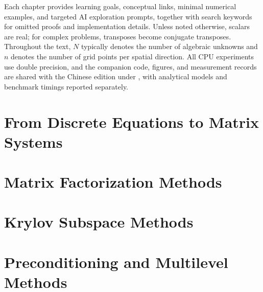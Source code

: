 \documentclass[11pt,openany]{book}
\begin{document}
\par
Each chapter provides learning goals, conceptual links, minimal numerical examples, and targeted AI exploration prompts, together with search keywords for omitted proofs and implementation details. Unless noted otherwise, scalars are real; for complex problems, transposes become conjugate transposes. Throughout the text, $N$ typically denotes the number of algebraic unknowns and $n$ denotes the number of grid points per spatial direction. All CPU experiments use double precision, and the companion code, figures, and measurement records are shared with the Chinese edition under , with analytical models and benchmark timings reported separately.
\tableofcontents
\mainmatter
\part{From Discrete Equations to Matrix Systems}



\part{Matrix Factorization Methods}






\part{Krylov Subspace Methods}






\part{Preconditioning and Multilevel Methods}






\end{document}
